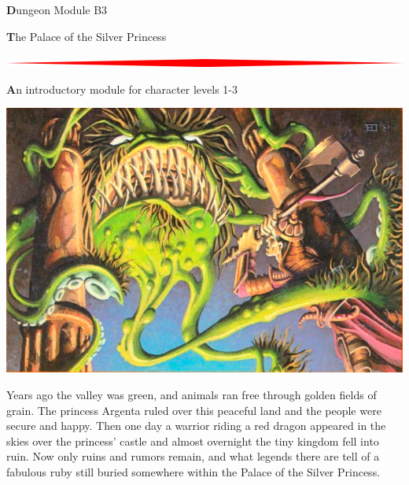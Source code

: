 \documentclass[10pt,twoside,twocolumn]{book}
\begin{document}
\selectfont %



\begin{titlepage}  \begin{onecolumn}
\begin{center}
	{\Huge \textbf Dungeon Module B3}

	{\Huge \textbf The Palace of the Silver Princess}
	
	\vspace{0.5cm}
	\includegraphics[width=\textwidth]{img/hr.jpg}
	
	\vspace{0.5cm}
	{\Large \textbf An introductory module for character levels 1-3}
	
	\vspace{0.5cm}
	\includegraphics[width=\textwidth]{img/cover.png}
	
	\vspace{0.5cm}
	Years ago the valley was green, and animals ran free through golden
	fields of grain. The princess Argenta ruled over this peaceful land
	and the people were secure and happy. Then one day a warrior riding
	a red dragon appeared in the skies over the princess’ castle and
	almost overnight the tiny kingdom fell into ruin. Now only ruins and
	rumors remain, and what legends there are tell of a fabulous ruby
	still buried somewhere within the Palace of the Silver Princess.


\end{center}
\end{onecolumn}
\end{titlepage}
\end{document}
